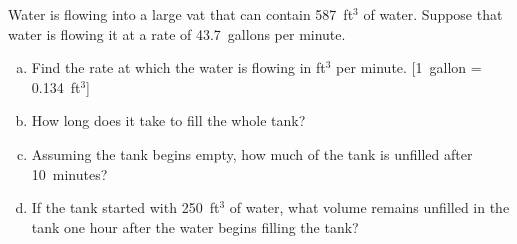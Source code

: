 \documentclass[11pt,letterpaper]{article}
\begin{document}
\newpage



 Water is flowing into a large vat that can contain 587~ft$^3$ of water. Suppose that water is flowing it at a rate of 43.7~gallons per minute. 
	\begin{enumerate}[(a)]
	\item Find the rate at which the water is flowing in ft$^3$ per minute. [1~gallon = 0.134~ft$^3$]
	\item How long does it take to fill the whole tank?
	\item Assuming the tank begins empty, how much of the tank is unfilled after 10~minutes?
	\item If the tank started with 250~ft$^3$ of water, what volume remains unfilled in the tank one hour after the water begins filling the tank?
	\end{enumerate} \pspace
\end{document}
